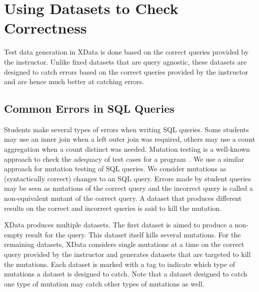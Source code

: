 \section{Using Datasets to Check Correctness}
\label{sec:datagen}
Test data generation in XData is done based on the correct queries provided by the instructor. Unlike fixed datasets that are query agnostic, these datasets are designed to catch errors based on the correct queries provided by the instructor and are hence much better at catching errors. 

\subsection{Common Errors in SQL Queries}
Students make several types of errors when writing SQL queries. Some students may use an inner join when a left outer join was required, others may use a count aggregation when a count distinct was needed. Mutation testing is a well-known approach to check the adequacy of test cases for a program~\cite{mutation}. We use a similar approach for mutation testing of SQL queries.  We consider mutations as (syntactically correct) changes to an SQL query. Errors made by student queries may be seen as mutations of the correct query and the incorrect query is called a non-equivalent mutant of the correct query. A dataset that produces different results on the correct and incorrect queries is said to kill the mutation. 

XData produces multiple datasets. The first dataset is aimed to produce a non-empty result for the query. This dataset itself kills several mutations. For the remaining datasets, XData considers single mutations at a time on the correct query provided by the instructor and generates datasets that are targeted to kill the mutations. Each dataset is marked with a tag to indicate which type of mutations a dataset is designed to catch. Note that a dataset designed to catch one type of mutation may catch other types of mutations as well. 

